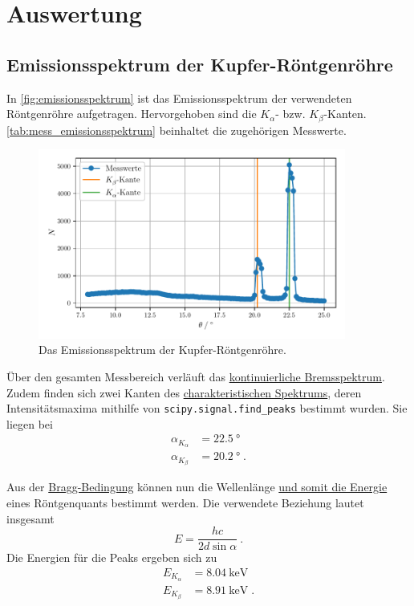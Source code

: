 \section{Auswertung}
\label{sec:auswertung}

\subsection{Emissionsspektrum der Kupfer-Röntgenröhre}
\label{sec:auswertung:emissionsspektrum}

In \autoref{fig:emissionsspektrum} ist das Emissionsspektrum der verwendeten Röntgenröhre aufgetragen.
Hervorgehoben sind die $K_\alpha$- bzw. $K_\beta$-Kanten.
\autoref{tab:mess_emissionsspektrum} beinhaltet die zugehörigen Messwerte.

\begin{figure}
    \centering
    \includegraphics[width=0.9\textwidth]{build/plt/emissionsspektrum.pdf}
    \caption{Das Emissionsspektrum der Kupfer-Röntgenröhre.}
    \label{fig:emissionsspektrum}
\end{figure}

Über den gesamten Messbereich verläuft das \hyperref[sec:theorie:bremsspektrum]{kontinuierliche Bremsspektrum}.
Zudem finden sich zwei Kanten des \hyperref[sec:theorie:char_spektrum]{charakteristischen Spektrums},
deren Intensitätsmaxima mithilfe von \texttt{scipy.signal.find\_peaks} bestimmt wurden.
Sie liegen bei
\begin{align*}
    \alpha_{K_\alpha} &= \SI{22.5}{\degree} \\
    \alpha_{K_\beta}  &= \SI{20.2}{\degree} \; .
\end{align*}

Aus der \hyperref[eqn:BraggBedingung]{Bragg-Bedingung} können nun
die Wellenlänge \hyperref[eqn:lambda_to_E]{und somit die Energie} eines Röntgenquants bestimmt werden.
Die verwendete Beziehung lautet insgesamt
\[ E = \frac{h c}{2 d \sin{\alpha}} \ . \]
Die Energien für die Peaks ergeben sich zu
\begin{align*}
    E_{K_\alpha} &= \SI{8.04}{\kilo\electronvolt} \\
    E_{K_\beta}  &= \SI{8.91}{\kilo\electronvolt} \; .
\end{align*}


